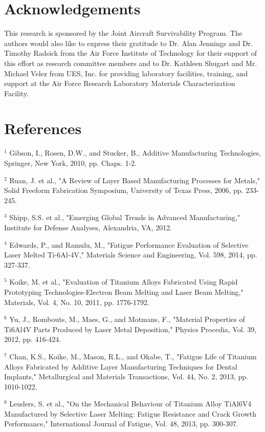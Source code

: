 \documentclass[10pt]{article}
\begin{document}
\section*{Acknowledgements}
This research is sponsored by the Joint Aircraft Survivability Program. The authors would also like to express their gratitude to Dr. Alan Jennings and Dr. Timothy Radsick from the Air Force Institute of Technology for their support of this effort as research committee members and to Dr. Kathleen Shugart and Mr. Michael Velez from UES, Inc. for providing laboratory facilities, training, and support at the Air Force Research Laboratory Materials Characterization Facility.

\section*{References}
${ }^{1}$ Gibson, I., Rosen, D.W., and Stucker, B., Additive Manufacturing Technologies, Springer, New York, 2010, pp. Chaps. 1-2.

${ }^{2}$ Ruan, J. et al., "A Review of Layer Based Manufacturing Processes for Metals," Solid Freeform Fabrication Symposium, University of Texas Press, 2006, pp. 233-245.

${ }^{3}$ Shipp, S.S. et al., "Emerging Global Trends in Advanced Manufacturing," Institute for Defense Analyses, Alexandria, VA, 2012.

${ }^{4}$ Edwards, P., and Ramulu, M., "Fatigue Performance Evaluation of Selective Laser Melted Ti-6Al-4V," Materials Science and Engineering, Vol. 598, 2014, pp. 327-337.

${ }^{5}$ Koike, M. et al., "Evaluation of Titanium Alloys Fabricated Using Rapid Prototyping Technologies-Electron Beam Melting and Laser Beam Melting," Materials, Vol. 4, No. 10, 2011, pp. 1776-1792.

${ }^{6}$ Yu, J., Rombouts, M., Maes, G., and Motmans, F., "Material Properties of Ti6Al4V Parts Produced by Laser Metal Deposition," Physics Procedia, Vol. 39, 2012, pp. 416-424.

${ }^{7}$ Chan, K.S., Koike, M., Mason, R.L., and Okabe, T., "Fatigue Life of Titanium Alloys Fabricated by Additive Layer Manufacturing Techniques for Dental Implants," Metallurgical and Materials Transactions, Vol. 44, No. 2, 2013, pp. 1010-1022.

${ }^{8}$ Leuders, S. et al., "On the Mechanical Behaviour of Titanium Alloy TiAl6V4 Manufactured by Selective Laser Melting: Fatigue Resistance and Crack Growth Performance," International Journal of Fatigue, Vol. 48, 2013, pp. 300-307.
\end{document}
